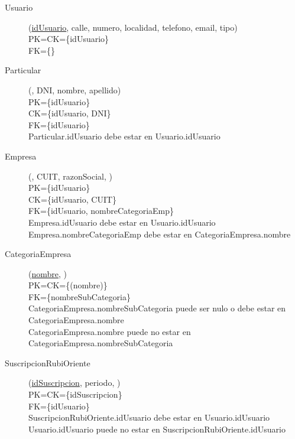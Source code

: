 \begin{description}

 \item[Usuario](\underline{idUsuario}, calle, numero, localidad, telefono, email, tipo)\\
PK=CK=\{idUsuario\}\\
FK=\{\}\\

 \item[Particular](\underline{}, DNI, nombre, apellido)\\
PK=\{idUsuario\}\\
CK=\{idUsuario, DNI\}\\
FK=\{idUsuario\}\\
Particular.idUsuario debe estar en Usuario.idUsuario

 \item[Empresa](\underline{}, CUIT, razonSocial, )\\
PK=\{idUsuario\}\\
CK=\{idUsuario, CUIT\}\\
FK=\{idUsuario, nombreCategoriaEmp\}\\
Empresa.idUsuario debe estar en Usuario.idUsuario\\
Empresa.nombreCategoriaEmp debe estar en CategoriaEmpresa.nombre

 \item[CategoriaEmpresa](\underline{nombre}, )\\
PK=CK=\{(nombre)\}\\
FK=\{nombreSubCategoria\}\\
CategoriaEmpresa.nombreSubCategoria puede ser nulo o debe estar en CategoriaEmpresa.nombre\\
CategoriaEmpresa.nombre puede no estar en CategoriaEmpresa.nombreSubCategoria

 \item[SuscripcionRubiOriente](\underline{idSuscripcion}, periodo, )\\
PK=CK=\{idSuscripcion\}\\
FK=\{idUsuario\}\\
SuscripcionRubiOriente.idUsuario debe estar en Usuario.idUsuario\\
Usuario.idUsuario puede no estar en SuscripcionRubiOriente.idUsuario


\end{description}
